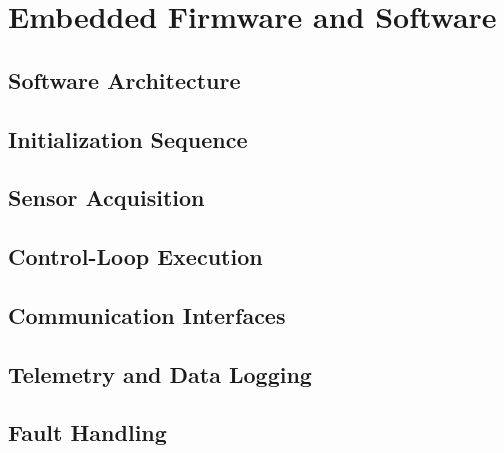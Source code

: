 \chapter{Embedded Firmware and Software}

\section{Software Architecture}

\section{Initialization Sequence}

\section{Sensor Acquisition}

\section{Control-Loop Execution}

\section{Communication Interfaces}

\section{Telemetry and Data Logging}

\section{Fault Handling}
